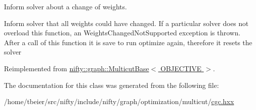 Inform solver about a change of weights. 

Inform solver that all weights could have changed. If a particular solver does not overload this function, an Weights\+Changed\+Not\+Supported exception is thrown. After a call of this function it is save to run optimize again, therefore it resets the solver 

Reimplemented from \hyperlink{classnifty_1_1graph_1_1MulticutBase_a4c7a44afdc661993b3252dba62b5386f}{nifty\+::graph\+::\+Multicut\+Base$<$ O\+B\+J\+E\+C\+T\+I\+V\+E $>$}.



The documentation for this class was generated from the following file\+:\begin{DoxyCompactItemize}
\item 
/home/tbeier/src/nifty/include/nifty/graph/optimization/multicut/\hyperlink{cgc_8hxx}{cgc.\+hxx}\end{DoxyCompactItemize}
